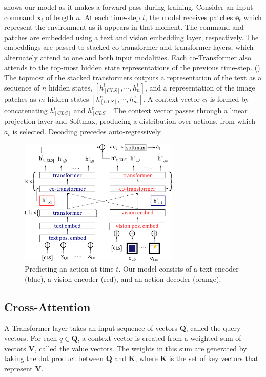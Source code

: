 \documentclass[11pt]{article}
\begin{document}
 shows our model as it makes a forward pass during training.
%
Consider an input command $\mathbf{x}_{i}$ of length $n$.
%
At each time-step $t$, the model receives patches $\mathbf{e}_t$ which represent the environment as it appears in that moment. 
%
The command and patches are embedded using a text and vision embedding layer, respectively. 
%
The embeddings are passed to stacked co-transformer and transformer layers, which alternately attend to one and both input modalities.
%
Each co-Transformer also attends to the top-most hidden state representations of the previous time-step.
%
()
%
The topmost of the stacked transformers outputs a representation of the text as a sequence of $n$ hidden states, $[h_{[CLS]}^l,\cdots,h_{n}^l]$, and a representation of the image patches as $m$ hidden states $[h^e_{[CLS]}, \cdots, h^{e}_{m}]$.
%
A context vector $c_t$ is formed by concatenating $h_{[CLS]}^l$ and $h_{[CLS]}^e$.
%
The context vector passes through a linear projection layer and Softmax, producing a distribution over actions, from which $a_t$ is selected.
%
Decoding precedes auto-regressively.

\begin{figure}
\includegraphics[width=3in]{training_model.png}
\caption{Predicting an action at time $t$. Our model consists of a text encoder (blue), a vision encoder (red), and an action decoder (orange). }
\label{fig:training_model}	
\end{figure}

\subsection{Cross-Attention}
A Transformer layer takes an input sequence of vectors $\mathbf{Q}$, called the query vectors. 
%
For each $q\in \mathbf{Q}$, a context vector is created from a weighted sum of vectors $\mathbf{V}$, called the value vectors.
%
The weights in this sum are generated by taking the dot product between $\mathbf{Q}$ and $\mathbf{K}$, where $\mathbf{K}$ is the set of key vectors that represent $\mathbf{V}$.
\end{document}
